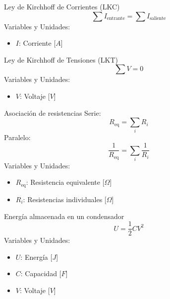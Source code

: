 \begin{landscape}
\begin{multicols}{3}
\columnbreak

\begin{teorema}{Ley de Kirchhoff de Corrientes (LKC)}
    $$\sum I_{\text{entrante}} = \sum I_{\text{saliente}}$$
    Variables y Unidades:
    \begin{itemize}
        \item $I$: Corriente [$A$]
    \end{itemize}
\end{teorema}

\begin{teorema}{Ley de Kirchhoff de Tensiones (LKT)}
    $$\sum V = 0$$
    Variables y Unidades:
    \begin{itemize}
        \item $V$: Voltaje [$V$]
    \end{itemize}
\end{teorema}

\columnbreak

\begin{teorema}{Asociación de resistencias}
    Serie: $$R_{\text{eq}} = \sum_i R_i$$
    Paralelo: $$\frac{1}{R_{\text{eq}}} = \sum_i \frac{1}{R_i}$$
    Variables y Unidades:
    \begin{itemize}
        \item $R_{\text{eq}}$: Resistencia equivalente [$\Omega$]
        \item $R_i$: Resistencias individuales [$\Omega$]
    \end{itemize}
\end{teorema}

\begin{teorema}{Energía almacenada en un condensador}
    $$U = \frac{1}{2} C V^2$$
    Variables y Unidades:
    \begin{itemize}
        \item $U$: Energía [$J$]
        \item $C$: Capacidad [$F$]
        \item $V$: Voltaje [$V$]
    \end{itemize}
\end{teorema}

\end{multicols}
\end{landscape}

